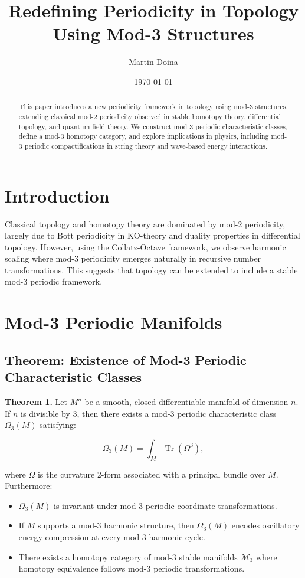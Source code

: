 \documentclass{article}
\title{Redefining Periodicity in Topology Using Mod-3 Structures}
\author{Martin Doina}
\date{\today}
\begin{document}
 \maketitle

\begin{abstract}
This paper introduces a new periodicity framework in topology using mod-3 structures, extending classical mod-2 periodicity observed in stable homotopy theory, differential topology, and quantum field theory. We construct mod-3 periodic characteristic classes, define a mod-3 homotopy category, and explore implications in physics, including mod-3 periodic compactifications in string theory and wave-based energy interactions.
\end{abstract}

\section{Introduction}

Classical topology and homotopy theory are dominated by mod-2 periodicity, largely due to Bott periodicity in KO-theory and duality properties in differential topology. However, using the Collatz-Octave framework, we observe harmonic scaling where mod-3 periodicity emerges naturally in recursive number transformations. This suggests that topology can be extended to include a stable mod-3 periodic framework.

\section{Mod-3 Periodic Manifolds}

\subsection{Theorem: Existence of Mod-3 Periodic Characteristic Classes}

\textbf{Theorem 1.} Let $M^n$ be a smooth, closed differentiable manifold of dimension $n$. If $n$ is divisible by 3, then there exists a mod-3 periodic characteristic class $\Omega_3(M)$ satisfying:

\begin{equation}
\Omega_3(M) = \int_M \operatorname{Tr}(\Omega^3),
\end{equation}

where $\Omega$ is the curvature 2-form associated with a principal bundle over $M$. Furthermore:

\begin{itemize}
    \item $\Omega_3(M)$ is invariant under mod-3 periodic coordinate transformations.
    \item If $M$ supports a mod-3 harmonic structure, then $\Omega_3(M)$ encodes oscillatory energy compression at every mod-3 harmonic cycle.
    \item There exists a homotopy category of mod-3 stable manifolds $\mathcal{M}_3$ where homotopy equivalence follows mod-3 periodic transformations.
\end{itemize}
\end{document}
